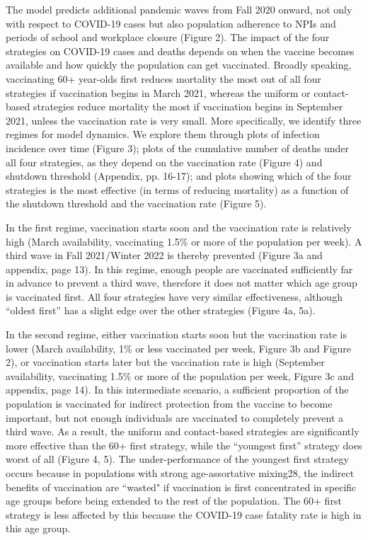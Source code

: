 The model predicts additional pandemic waves from Fall 2020 onward, not only with respect to COVID-19 cases but also population adherence to NPIs and periods of school and workplace closure (Figure 2). The impact of the four strategies on COVID-19 cases and deaths depends on when the vaccine becomes available and how quickly the population can get vaccinated. Broadly speaking, vaccinating 60+ year-olds first reduces mortality the most out of all four strategies if vaccination begins in March 2021, whereas the uniform or contact-based strategies reduce mortality the most if vaccination begins in September 2021, unless the vaccination rate is very small. More specifically, we identify three regimes for model dynamics. We explore them through plots of infection incidence over time (Figure 3); plots of the cumulative number of deaths under all four strategies, as they depend on the vaccination rate (Figure 4) and shutdown threshold (Appendix, pp. 16-17); and plots showing which of the four strategies is the most effective (in terms of reducing mortality) as a function of the shutdown threshold and the vaccination rate (Figure 5). 

In the first regime, vaccination starts soon and the vaccination rate is relatively high (March availability, vaccinating 1.5\% or more of the population per week). A third wave in Fall 2021/Winter 2022 is thereby prevented (Figure 3a and appendix, page 13).  In this regime, enough people are vaccinated sufficiently far in advance to prevent a third wave, therefore it does not matter which age group is vaccinated first. All four strategies have very similar effectiveness, although “oldest first” has a slight edge over the other strategies (Figure 4a, 5a). 

In the second regime, either vaccination starts soon but the vaccination rate is lower (March availability, 1\% or less vaccinated per week, Figure 3b and Figure 2), or vaccination starts later but the vaccination rate is high (September availability, vaccinating 1.5\% or more of the population per week, Figure 3c and appendix, page 14).  In this intermediate scenario, a sufficient proportion of the population is vaccinated for indirect protection from the vaccine to become important, but not enough individuals are vaccinated to completely prevent a third wave.  As a result, the uniform and contact-based strategies are significantly more effective than the 60+ first strategy, while the “youngest first” strategy does worst of all (Figure 4, 5).  The under-performance of the youngest first strategy occurs because in populations with strong age-assortative mixing28, the indirect benefits of vaccination are “wasted" if vaccination is first concentrated in specific age groups before being extended to the rest of the population.  The 60+ first strategy is less affected by this because the COVID-19 case fatality rate is high in this age group. 

